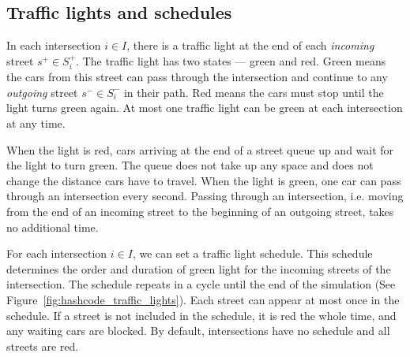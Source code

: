 \subsection{Traffic lights and schedules}

In each intersection $i \in I$, there is a traffic light at the end of each \textit{incoming} street $s^+ \in S_i^+$. The traffic light has two states --- green and red. Green means the cars from this street can pass through the intersection and continue to any \textit{outgoing} street $s^- \in S_i^-$ in their path. Red means the cars must stop until the light turns green again. At most one traffic light can be green at each intersection at any time.

When the light is red, cars arriving at the end of a street queue up and wait for the light to turn green. The queue does not take up any space and does not change the distance cars have to travel. When the light is green, one car can pass through an intersection every second. Passing through an intersection, i.e. moving from the end of an incoming street to the beginning of an outgoing street, takes no additional time.

For each intersection $i \in I$, we can set a traffic light schedule. This schedule determines the order and duration of green light for the incoming streets of the intersection. The schedule repeats in a cycle until the end of the simulation (See Figure~\ref{fig:hashcode_traffic_lights}). Each street can appear at most once in the schedule. If a street is not included in the schedule, it is red the whole time, and any waiting cars are blocked. By default, intersections have no schedule and all streets are red.

